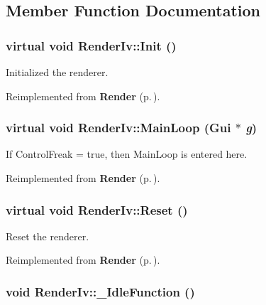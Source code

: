\subsection{Member Function Documentation}
\subsubsection{\setlength{\rightskip}{0pt plus 5cm}virtual void Render\-Iv::Init ()\hspace{0.3cm}{\tt  [virtual]}}\label{class_RenderIv_a5}


Initialized the renderer.



Reimplemented from {\bf Render} {\rm (p.\,\pageref{class_Render_a4})}.
\subsubsection{\setlength{\rightskip}{0pt plus 5cm}virtual void Render\-Iv::Main\-Loop ({\bf Gui} $\ast$ {\em g})\hspace{0.3cm}{\tt  [virtual]}}\label{class_RenderIv_a6}


If Control\-Freak = true, then Main\-Loop is entered here.



Reimplemented from {\bf Render} {\rm (p.\,\pageref{class_Render_a6})}.
\subsubsection{\setlength{\rightskip}{0pt plus 5cm}virtual void Render\-Iv::Reset ()\hspace{0.3cm}{\tt  [virtual]}}\label{class_RenderIv_a4}


Reset the renderer.



Reimplemented from {\bf Render} {\rm (p.\,\pageref{class_Render_a7})}.
\subsubsection{\setlength{\rightskip}{0pt plus 5cm}void Render\-Iv::\_\-Idle\-Function ()\hspace{0.3cm}{\tt  [inline, protected]}}\label{class_RenderIv_b0}


